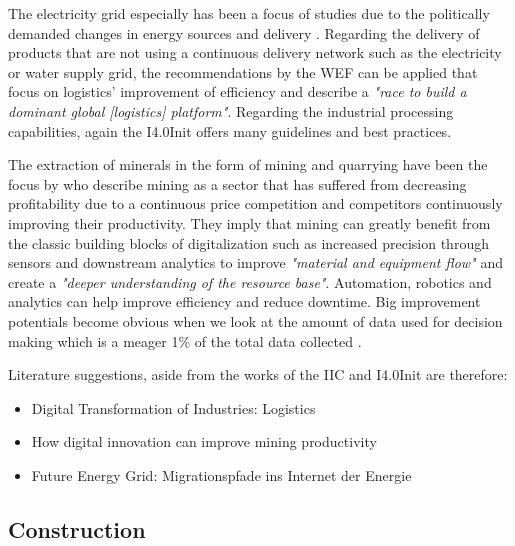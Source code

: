 The electricity grid especially has been a focus of studies due to the politically demanded changes in energy sources and delivery \cite[p.12ff]{AppelrathKagermannMayer2012}. Regarding the delivery of products that are not using a continuous delivery network such as the electricity or water supply grid, the recommendations by the \ac{WEF} can be applied that focus on logistics' improvement of efficiency and describe a \emph{"race to build a dominant global [logistics] platform"}\cite{worldforumlogistics:2016}. Regarding the industrial processing capabilities, again the \acf{I4.0Init} offers many guidelines and best practices.

The extraction of minerals in the form of mining and quarrying have been the focus by \citeauthor{mckinseymining:2015} who describe mining as a sector that has suffered from decreasing profitability due to a continuous price competition and competitors continuously improving their productivity. They imply that mining can greatly benefit from the classic building blocks of digitalization such as increased precision through sensors and downstream analytics to improve \emph{"material and equipment flow"} and create a \emph{"deeper understanding of the resource base"}. Automation, robotics and analytics can help improve efficiency and reduce downtime. Big improvement potentials become obvious when we look at the amount of data used for decision making which is a meager 1\% of the total data collected \cite[p.7]{mckinseymining:2015}.

Literature suggestions, aside from the works of the \ac{IIC} and \ac{I4.0Init} are therefore:

\begin{itemize}
\item Digital Transformation of Industries: Logistics \cite{worldforumlogistics:2016}
\item How digital innovation can improve mining productivity \cite{mckinseymining:2015}
\item Future Energy Grid: Migrationspfade ins Internet der Energie \cite{AppelrathKagermannMayer2012}
\end{itemize}


\subsection{Construction}

